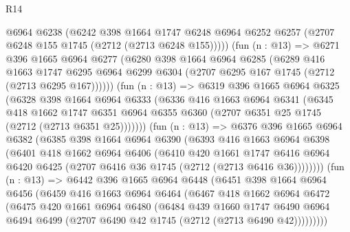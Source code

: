 \begin{lexlean}{R14}
\begin{coremodule}
          @6964
          @6238
          (@6242
            @398
            @1664
            @1747
            @6248
            @6964
            @6252
            @6257
            (@2707 @6248 @155 @1745 (@2712 (@2713 @6248 @155)))))
        (fun (n : @13) =>
        @6271
          @396
          @1665
          @6964
          @6277
          (@6280
            @398
            @1664
            @6964
            @6285
            (@6289
              @416
              @1663
              @1747
              @6295
              @6964
              @6299
              @6304
              (@2707 @6295 @167 @1745 (@2712 (@2713 @6295 @167))))))
        (fun (n : @13) =>
        @6319
          @396
          @1665
          @6964
          @6325
          (@6328
            @398
            @1664
            @6964
            @6333
            (@6336
              @416
              @1663
              @6964
              @6341
              (@6345
                @418
                @1662
                @1747
                @6351
                @6964
                @6355
                @6360
                (@2707 @6351 @25 @1745 (@2712 (@2713 @6351 @25)))))))
        (fun (n : @13) =>
        @6376
          @396
          @1665
          @6964
          @6382
          (@6385
            @398
            @1664
            @6964
            @6390
            (@6393
              @416
              @1663
              @6964
              @6398
              (@6401
                @418
                @1662
                @6964
                @6406
                (@6410
                  @420
                  @1661
                  @1747
                  @6416
                  @6964
                  @6420
                  @6425
                  (@2707 @6416 @36 @1745 (@2712 (@2713 @6416 @36))))))))
        (fun (n : @13) =>
        @6442
          @396
          @1665
          @6964
          @6448
          (@6451
            @398
            @1664
            @6964
            @6456
            (@6459
              @416
              @1663
              @6964
              @6464
              (@6467
                @418
                @1662
                @6964
                @6472
                (@6475
                  @420
                  @1661
                  @6964
                  @6480
                  (@6484
                    @439
                    @1660
                    @1747
                    @6490
                    @6964
                    @6494
                    @6499
                    (@2707 @6490 @42 @1745 (@2712 (@2713 @6490 @42)))))))))

\end{coremodule}
\end{lexlean}
